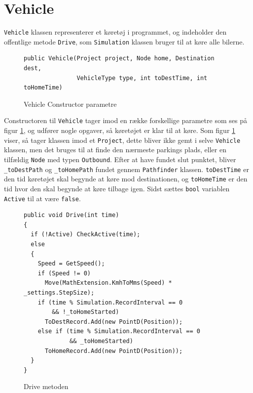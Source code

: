\section{Vehicle}\label{Vehicle}
\texttt{Vehicle} klassen representerer et køretøj i programmet, og indeholder den offentlige metode \texttt{Drive}, som \texttt{Simulation} klassen bruger til at køre alle bilerne. 

\begin{figure}[H]
\begin{lstlisting}
public Vehicle(Project project, Node home, Destination dest, 
               VehicleType type, int toDestTime, int toHomeTime)
\end{lstlisting}
\caption{Vehicle Constructor parametre}\label{VehicleConstructor}
\end{figure}

Constructoren til \texttt{Vehicle} tager imod en række forskellige parametre som ses på figur \ref{VehicleConstructor}, og udfører nogle opgaver, så køretøjet er klar til at køre. Som figur \ref{VehicleConstructor} viser, så tager klassen imod et \texttt{Project}, dette bliver ikke gemt i selve \texttt{Vehicle} klassen, men det bruges til at finde den nærmeste parkings plads, eller en tilfældig \texttt{Node} med typen \texttt{Outbound}. Efter at have fundet slut punktet, bliver \texttt{\_toDestPath} og \texttt{\_toHomePath} fundet gennem \texttt{Pathfinder} klassen. \texttt{toDestTime} er den tid køretøjet skal begynde at køre mod destinationen, og \texttt{toHomeTime} er den tid hvor den skal begynde at køre tilbage igen. Sidst sættes \texttt{bool} variablen \texttt{Active} til at være \texttt{false}.

\begin{figure}[H]
\begin{lstlisting}
public void Drive(int time)
{
  if (!Active) CheckActive(time);
  else
  {
    Speed = GetSpeed();
    if (Speed != 0)
      Move(MathExtension.KmhToMms(Speed) * _settings.StepSize);
    if (time % Simulation.RecordInterval == 0 
        && !_toHomeStarted)
      ToDestRecord.Add(new PointD(Position));
    else if (time % Simulation.RecordInterval == 0 
             && _toHomeStarted)
      ToHomeRecord.Add(new PointD(Position));
  }
}
\end{lstlisting}
\caption{Drive metoden}\label{DriveCode}
\end{figure}

